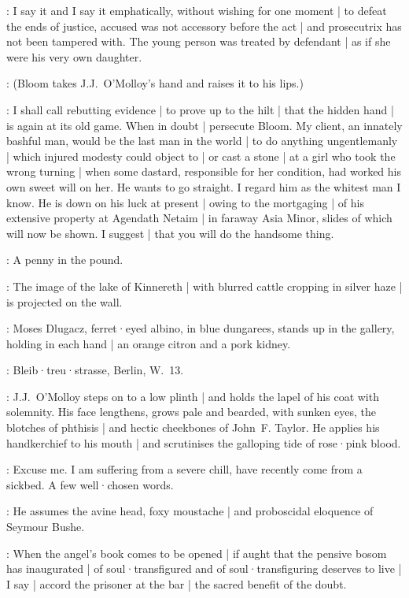 
\JJOM:
I say it
and I say it emphatically,
without wishing for one moment |
to defeat the ends of justice,
accused was not accessory before the act |
and prosecutrix has not been tampered with.
The young person was treated by defendant |
as if she were his very own daughter.

:
(Bloom takes J.J.~O'Molloy's hand and raises it to his lips.)

\JJOM:
I shall call rebutting evidence |
to prove up to the hilt |
that the hidden hand |
is again at its old game.
When in doubt |
persecute Bloom.
My client,
an innately bashful man,
would be the last man in the world |
to do anything ungentlemanly |
which injured modesty could object to |
or cast a stone |
at a girl who took the wrong turning |
when some dastard,
responsible for her condition,
had worked his own sweet will on her.
He wants to go straight.
I regard him as the whitest man I know.
He is down on his luck at present |
owing to the mortgaging |
of his extensive property at Agendath Netaim |
in faraway Asia Minor,
slides of which will now be shown.
I suggest |
that you will do the handsome thing.

\Bloom:
A penny in the pound.

:
The image of the lake of Kinnereth |
with blurred cattle cropping in silver haze |
is projected on the wall.

:
Moses Dlugacz,
ferret·eyed albino,
in blue dungarees,
stands up in the gallery,
holding in each hand |
an orange citron and a pork kidney.

\Dlugacz:
Bleib·treu·strasse,
Berlin,
W.~13.

:
J.J.~O'Molloy steps on to a low plinth |
and holds the lapel of his coat with solemnity.
His face lengthens,
grows pale and bearded,
with sunken eyes,
the blotches of phthisis |
and hectic cheekbones of John~F. Taylor.
He applies his handkerchief to his mouth |
and scrutinises the galloping tide of rose·pink blood.

\JJOM:
Excuse me.
I am suffering from a severe chill,
have recently come from a sickbed.
A few well·chosen words.

:
He assumes the avine head,
foxy moustache |
and proboscidal eloquence of Seymour Bushe.

\JJOM:
When the angel's book comes to be opened |
if aught that the pensive bosom has inaugurated |
of soul·transfigured and of soul·transfiguring deserves to live |
I say |
accord the prisoner at the bar |
the sacred benefit of the doubt.

